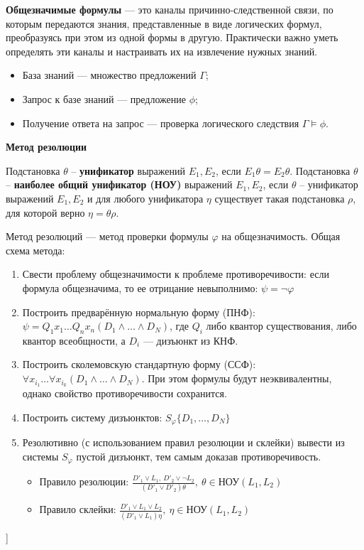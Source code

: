 \textbf{Общезначимые формулы} --- это каналы причинно-следственной связи, по которым передаются знания, представленные в виде логических формул, преобразуясь при этом из одной формы в другую.
Практически важно уметь определять эти каналы и настраивать их на извлечение нужных знаний.
\begin{itemize}
    \item База знаний --- множество предложений $\Gamma$;
    \item Запрос к базе знаний --- предложение $\phi$;
    \item Получение ответа на запрос --- проверка логического следствия $\Gamma \models \phi$.
\end{itemize}

\textbf{Метод резолюции}

Подстановка $\theta$ -- \textbf{унификатор} выражений $E_1, E_2$, если $E_1 \theta = E_2 \theta$. Подстановка $\theta$ -- \textbf{наиболее общий унификатор (НОУ)} выражений $E_1, E_2$, если $\theta$ -- унификатор выражений $E_1, E_2$ и для любого унификатора $\eta$ существует такая подстановка $\rho$, для которой верно $\eta = \theta \rho$.

Метод резолюций --- метод проверки формулы $\varphi$ на общезначимость. 
Общая схема метода:
\begin{enumerate}
    \item Свести проблему общезначимости к проблеме противоречивости: если формула общезначима, то ее отрицание невыполнимо: $\psi = \neg \varphi$
    \item Построить предварённую нормальную форму (ПНФ): $\psi = Q_1x_1 \dots Q_nx_n(D_1 \wedge \dots \wedge D_N)$, где $Q_i$ либо квантор существования, либо квантор всеобщности, а $D_i$ --- дизъюнкт из КНФ.
    \item Построить сколемовскую стандартную форму (ССФ): $\forall x_{i_1} \dots \forall x_{i_k}(D_1 \wedge \dots \wedge D_N)$.
    При этом формулы будут неэквивалентны, однако свойство противоречивости сохранится.
    \item Построить систему дизъюнктов: $S_\varphi \{D_1, \dots, D_N\}$
    \item Резолютивно (с использованием правил резолюции и склейки) вывести из системы $S_\varphi$ пустой дизъюнкт, тем самым доказав противоречивость.
    \begin{itemize}
        \item Правило резолюции: $\frac{D'_1 \vee L_1,~D'_2 \vee \neg L_2}{(D'_1 \vee D'_2)\theta},~\theta \in \text{НОУ}(L_1, L_2)$
        \item Правило склейки: $\frac{D'_1 \vee L_1 \vee L_2}{(D'_1 \vee L_1)\eta},~\eta \in \text{НОУ}(L_1,L_2)$
    \end{itemize}
\end{enumerate}


\bigbreak
[\cite[page 69-96]{replace_me}]
